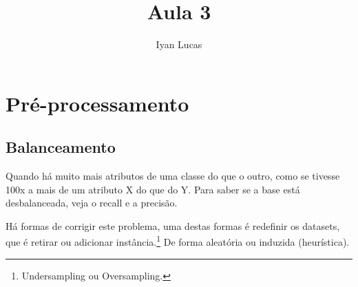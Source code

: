 \documentclass[oneside]{article}            %
\title{Aula 3}
\author{Iyan Lucas}
\begin{document}
\maketitle
\section{Pré-processamento}
\subsection{Balanceamento}
Quando há muito mais atributos de uma classe do que o outro, como se tivesse 100x a mais de um atributo X do que do Y.
Para saber se a base está desbalanceada, veja o recall e a precisão.

Há formas de corrigir este problema, uma destas formas é redefinir os datasets, que é retirar ou adicionar instância.\footnote{
    Undersampling ou Oversampling.
}
De forma aleatória ou induzida (heurística).
\end{document}
